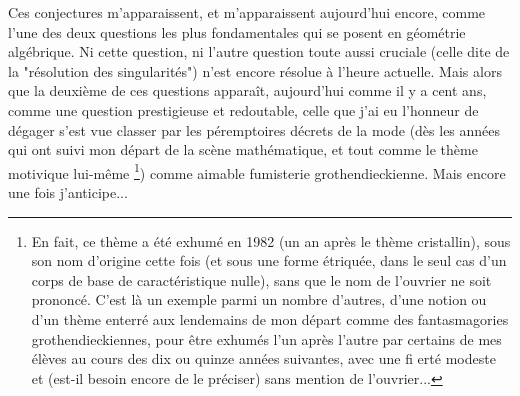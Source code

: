Ces conjectures m'apparaissent, et m'apparaissent aujourd'hui encore, comme l'une des deux questions les plus fondamentales qui se posent en géométrie algébrique. Ni cette question, ni l'autre question toute aussi cruciale (celle dite de la "résolution des singularités") n'est encore résolue à l'heure actuelle. Mais alors que la deuxième de ces questions apparaît, aujourd'hui comme il y a cent ans, comme une question prestigieuse et redoutable, celle que j'ai eu l'honneur de dégager s'est vue classer par les péremptoires décrets de la mode (dès les années qui ont suivi mon départ de la scène mathématique, et tout comme le thème motivique lui-même \footnote{En fait, ce thème a été exhumé en 1982 (un an après le thème cristallin), sous son nom d'origine cette fois (et sous une forme étriquée, dans le seul cas d'un corps de base de caractéristique nulle), sans que le nom de l'ouvrier ne soit prononcé. C'est là un exemple parmi un nombre d'autres, d'une notion ou d'un thème enterré aux lendemains de mon départ comme des fantasmagories grothendieckiennes, pour être exhumés l'un après l'autre par certains de mes élèves au cours des dix ou quinze années suivantes, avec une fi erté modeste et (est-il besoin encore de le préciser) sans mention de l'ouvrier...}) comme aimable fumisterie grothendieckienne. Mais encore une fois j'anticipe...